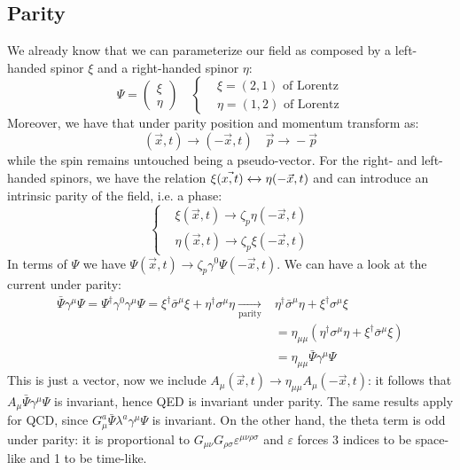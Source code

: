 \documentclass[../main.tex]{subfiles}
\begin{document}
\subsection{Parity}
We already know that we can parameterize our field as composed by a left-handed spinor $\xi$ and a right-handed spinor $\eta$:
\[
\Psi=\left(\begin{array}{c}
     \xi\\
     \eta
\end{array}\right)
\quad
\left\{
\begin{aligned}
&\xi=(2,1) \text{ of Lorentz}\\
&\eta=(1,2) \text{ of Lorentz}
\end{aligned}
\right.
\]
Moreover, we have that under parity position and momentum transform as:
\[
(\Vec{x},t)\xrightarrow[]{}(-\Vec{x},t) \quad \Vec{p}\xrightarrow[]{}-\Vec{p}
\]
while the spin remains untouched being a pseudo-vector. For the right- and left-handed spinors, we have the relation $\xi(\Vec{x,t})\xleftrightarrow[]{}\eta(-\Vec{x},t)$ and can introduce an intrinsic parity of the field, i.e. a phase:
\[
\left\{
\begin{aligned}
&\xi(\Vec{x},t)\xrightarrow[]{}\zeta_p\eta(-\Vec{x},t)\\
&\eta(\Vec{x},t)\xrightarrow[]{}\zeta_p\xi(-\Vec{x},t)
\end{aligned}
\right.
\]
In terms of $\Psi$ we have $\Psi(\Vec{x},t)\xrightarrow[]{}\zeta_p\gamma^0\Psi(-\Vec{x},t).$ We can have a look at the current under parity:
\begin{align*}
\bar{\Psi}\gamma^\mu\Psi=\Psi^\dagger\gamma^0\gamma^\mu\Psi=\xi^\dagger\bar{\sigma}^\mu\xi+\eta^\dagger\sigma^\mu\eta\xrightarrow[\text{parity}]{}&\eta^\dagger\bar{\sigma}^\mu\eta+\xi^\dagger\sigma^\mu\xi\\
&=\eta_{\mu\mu}(\eta^\dagger\sigma^\mu\eta+\xi^\dagger\bar{\sigma}^\mu\xi)\\
&=\eta_{\mu\mu}\bar{\Psi}\gamma^\mu\Psi
\end{align*}
This is just a vector, now we include $A_\mu(\Vec{x},t)\xrightarrow[]{}\eta_{\mu\mu}A_\mu(-\Vec{x},t)$: it follows that $A_\mu\bar{\Psi}\gamma^\mu\Psi$ is invariant, hence QED is invariant under parity. The same results apply for QCD, since $G_\mu^a\bar{\Psi}\lambda^a\gamma^\mu\Psi$ is invariant. On the other hand, the theta term is odd under parity: it is proportional to $G_{\mu\nu}G_{\rho\sigma}\varepsilon^{\mu\nu\rho\sigma}$ and $\varepsilon$ forces 3 indices to be space-like and 1 to be time-like.
\end{document}
